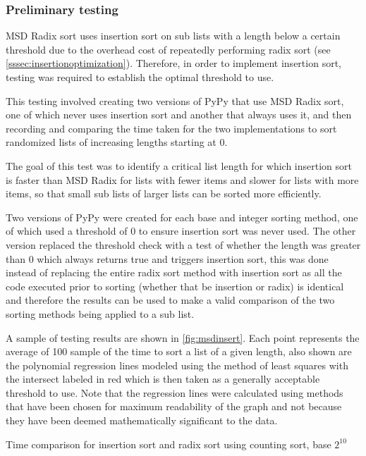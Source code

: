 \documentclass[12pt]{article}
\begin{document}
\subsubsection{Preliminary testing}
\label{sssec:insertiontesting}
MSD Radix sort uses insertion sort on sub lists with a length below a certain threshold due to the overhead cost of repeatedly performing radix sort (see \ref{sssec:insertionoptimization}). Therefore, in order to implement insertion sort, testing was required to establish the optimal threshold to use.
\par
This testing involved creating two versions of PyPy that use MSD Radix sort, one of which never uses insertion sort and another that always uses it, and then recording and comparing the time taken for the two implementations to sort randomized lists of increasing lengths starting at 0. 
\par
The goal of this test was to identify a critical list length for which insertion sort is faster than MSD Radix for lists with fewer items and slower for lists with more items, so that small sub lists of larger lists can be sorted more efficiently.
\par
Two versions of PyPy were created for each base and integer sorting method, one of which used a threshold of $0$ to ensure insertion sort was never used. The other version replaced the threshold check with a test of whether the length was greater than 0 which always returns true and triggers insertion sort, this was done instead of replacing the entire radix sort method with insertion sort as all the code executed prior to sorting (whether that be insertion or radix) is identical and therefore the results can be used to make a valid comparison of the two sorting methods being applied to a sub list.
\par
A sample of testing results are shown in \autoref{fig:msdinsert}. Each point represents the average of 100 sample of the time to sort a list of a given length, also shown are the polynomial regression lines modeled using the method of least squares with the intersect labeled in red which is then taken as a generally acceptable threshold to use. Note that the regression lines were calculated using methods that have been chosen for maximum readability of the graph and not because they have been deemed mathematically significant to the data.
\begin{table}[h]
	\begin{minipage}{\textwidth}
		\captionsetup{type=figure}
		\centering
		\caption{\label{fig:msdinsert}Time comparison for insertion sort and radix sort using counting sort, base $2^{10}$}
		
	\end{minipage}
	
\end{table}
\pagebreak
\end{document}
